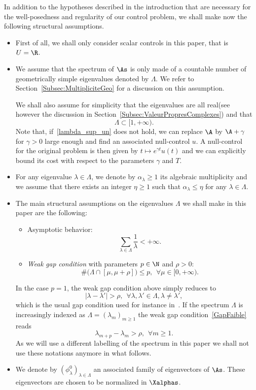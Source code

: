 In addition to the hypotheses described in the introduction that are necessary for the well-posedness and regularity of our control problem, we shall make now the following structural assumptions.
\begin{itemize}
\item First of all, we shall only consider scalar controls in this paper, that is $U=\R$.
\item We assume that the spectrum of $\As$ is only made of a countable number of geometrically simple eigenvalues denoted by $\Lambda$. We refer to Section~\ref{Subsec:MultipliciteGeo} for a discussion on this assumption.

We shall also assume for simplicity that the eigenvalues are all real\linebreak(see however the discussion in Section~\ref{Subsec:ValeurPropresComplexes}) and that
\begin{equation}\label{lambda_sup_un}
\Lambda\subset[1,+\infty).
\end{equation}
Note that, if~\eqref{lambda_sup_un} does not hold, we can replace $\A$ by $\A+\gamma$ for $\gamma>0$ large enough and find an associated null-control $u$. A null-control for the original problem is then given by $t\mapsto e^{\gamma t} u(t)$ and we can explicitly bound its cost with respect to the parameters $\gamma$ and $T$.
\item For any eigenvalue $\lambda \in \Lambda$, we denote by $\alpha_\lambda \geq 1$ its algebraic multiplicity and we assume that there exists an integer $\eta \geq 1$ such that $\alpha_\lambda\leq \eta$ for any $\lambda\in \Lambda$.
\item The main structural assumptions on the eigenvalues $\Lambda$ we shall make in this paper are the following:
\begin{itemize}
\item Asymptotic behavior:
\begin{equation}\label{SommabiliteVP}
\sum_{\lambda\in \Lambda} \frac{1}{\lambda} < +\infty.
\end{equation}
\item \emph{Weak gap condition} with parameters $p\in \N$ and $\rho>0$:
\begin{equation}\label{GapFaible}
\# \bigg(\Lambda \cap [\mu,\mu+\rho] \bigg) \leq p, \ \ \forall \mu\in [0,+\infty).
\end{equation}
\end{itemize}
In the case $p=1$, the weak gap condition above simply reduces to
\[
|\lambda-\lambda'|> \rho, \ \ \forall \lambda,\lambda'\in \Lambda, \lambda\neq\lambda',
\]
which is the usual gap condition used for instance in~\cite{FattoriniRussell71}. If the spectrum $\Lambda$ is increasingly indexed as $\Lambda= (\lambda_m)_{m \geq 1}$ the weak gap condition~\eqref{GapFaible} reads
\[
\lambda_{m+p}-\lambda_m > \rho, \ \ \forall m \geq 1.
\]
As we will use a different labelling of the spectrum in this paper we shall not use these notations anymore in what follows.
\item We denote by $(\phi_\lambda^0)_{\lambda\in \Lambda}$ an associated family of eigenvectors of $\As$. These eigenvectors are chosen to be normalized in $\Xalphas$.


\end{itemize}
